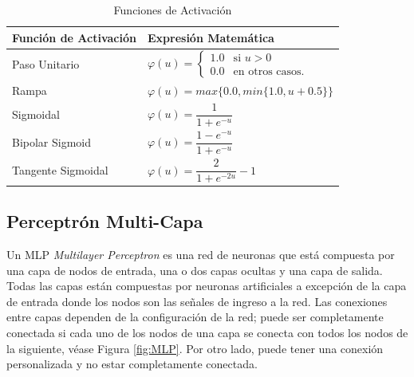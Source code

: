 \begin{table}[H]
\centering 
\renewcommand{\arraystretch}{1.8}
\begin{tabular}{| >{\centering\arraybackslash}m{2.4cm} | >{\arraybackslash}m{6cm}|}
\hline %
\textbf{Función de Activación} & \textbf{Expresión Matemática}\\ 
\hline 
Paso Unitario & $\varphi(u) = \begin{cases} 1.0 &\mbox{si } u > 0 \\ 
0.0 & \mbox{en otros casos}. \end{cases}$\\  \hline 
Rampa & $\varphi(u) = max \lbrace 0.0, min \lbrace 1.0, u+0.5 \rbrace \rbrace$\\ \hline 
Sigmoidal & $\varphi(u) = \dfrac{1}{1+e^{-u}}$\\ \hline 
Bipolar Sigmoid & $\varphi(u) = \dfrac{1-e^{-u}}{1+e^{-u}}$\\ \hline 
Tangente Sigmoidal & $\varphi(u) = \dfrac{2}{1+e^{-2u}}-1$\\ \hline 
\end{tabular}
\caption{Funciones de Activación}
\label{tab:funactivacion}
\end{table}

\subsection{Perceptrón Multi-Capa}

Un MLP \textit{Multilayer Perceptron} es una red de neuronas que está compuesta por una capa de nodos de entrada, una o dos capas ocultas y una capa de salida. Todas las capas están compuestas por neuronas artificiales a excepción de la capa de entrada donde los nodos son las señales de ingreso a la red. Las conexiones entre capas dependen de la configuración de la red; puede ser completamente conectada si cada uno de los nodos de una capa se conecta con todos los nodos de la siguiente, véase Figura \ref{fig:MLP}. Por otro lado, puede tener una conexión personalizada y no estar completamente conectada.

